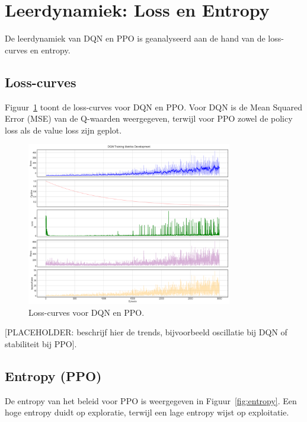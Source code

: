 \documentclass[a4paper,11pt]{report}
\begin{document}
\section{Leerdynamiek: Loss en Entropy}
De leerdynamiek van DQN en PPO is geanalyseerd aan de hand van de loss-curves
en entropy.

\subsection{Loss-curves}
Figuur~\ref{fig:loss_curves} toont de loss-curves voor DQN en PPO. Voor DQN is
de Mean Squared Error (MSE) van de Q-waarden weergegeven, terwijl voor PPO
zowel de policy loss als de value loss zijn geplot.

\begin{figure}[ht]
    \centering
    \includegraphics[width=0.8\textwidth]{../Experimenten/Experiment1Snake/DQN/dqn_analysis.png}
    \caption{Loss-curves voor DQN en PPO.}
    \label{fig:loss_curves}
\end{figure}

[PLACEHOLDER: beschrijf hier de trends, bijvoorbeeld oscillatie bij DQN of stabiliteit bij PPO].

\subsection{Entropy (PPO)}
De entropy van het beleid voor PPO is weergegeven in Figuur~\ref{fig:entropy}.
Een hoge entropy duidt op exploratie, terwijl een lage entropy wijst op
exploitatie.
\end{document}
